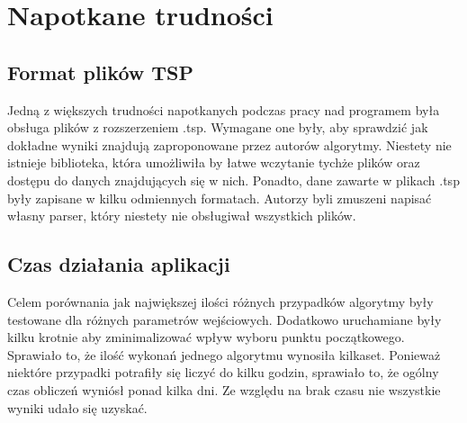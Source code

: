 \section{Napotkane trudności}

\subsection{Format plików TSP}

Jedną z większych trudności napotkanych podczas pracy nad programem 
była obsługa plików z rozszerzeniem .tsp. Wymagane one były, aby sprawdzić
jak dokładne wyniki znajdują zaproponowane przez autorów algorytmy. Niestety
nie istnieje biblioteka, która umożliwiła by łatwe wczytanie tychże plików oraz dostępu
do danych znajdujących się w nich. Ponadto, dane zawarte w plikach .tsp były zapisane 
w kilku odmiennych formatach. Autorzy byli zmuszeni napisać własny
parser, który niestety nie obsługiwał wszystkich plików. 

\subsection{Czas działania aplikacji}

Celem porównania jak największej ilości różnych przypadków algorytmy były testowane dla 
różnych parametrów wejściowych. Dodatkowo uruchamiane były kilku krotnie aby zminimalizować
wpływ wyboru punktu początkowego. Sprawiało to, że ilość wykonań jednego algorytmu wynosiła 
kilkaset. Ponieważ niektóre przypadki potrafiły się liczyć do kilku godzin, sprawiało to, że
ogólny czas obliczeń wyniósł ponad kilka dni. Ze względu na brak czasu nie wszystkie wyniki 
udało się uzyskać.